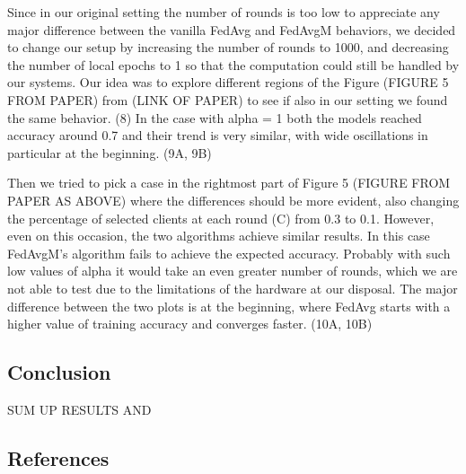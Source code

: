 \documentclass[twocolumn]{article}
\begin{document}
Since in our original setting the number of rounds is too low to appreciate any major difference between the vanilla FedAvg and FedAvgM behaviors, we decided to change our setup by increasing the number of rounds to 1000, and decreasing the number of local epochs to 1 so that the computation could still be handled by our systems.
Our idea was to explore different regions of the Figure (FIGURE 5 FROM PAPER) from (LINK OF PAPER) to see if also in our setting we found the same behavior.
(8)
In the case with alpha = 1 both the models reached accuracy around 0.7 and their trend is very similar, with wide oscillations in particular at the beginning.
(9A, 9B)

Then we tried to pick a case in the rightmost part of Figure 5 (FIGURE FROM PAPER AS ABOVE) where the differences should be more evident, also changing the percentage of selected clients at each round (C) from 0.3 to 0.1. 
However, even on this occasion, the two algorithms achieve similar results. In this case FedAvgM's algorithm fails to achieve the expected accuracy. Probably with such low values of alpha it would take an even greater number of rounds, which we are not able to test due to the limitations of the hardware at our disposal. The major difference between the two plots is at the beginning, where FedAvg starts with a higher value of training accuracy and converges faster.
(10A, 10B)



\subsection{Conclusion}
SUM UP RESULTS AND 
\subsection{References}
\end{document}
